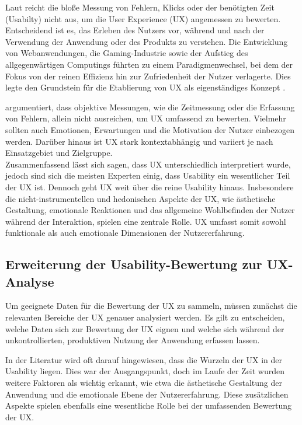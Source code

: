 \documentclass[12pt,oneside]{article}
\begin{document}
Laut \cite{GOISTAI} reicht die bloße Messung von Fehlern, Klicks oder der benötigten Zeit (Usabilty) nicht aus, um die User Experience (UX) angemessen zu bewerten. Entscheidend ist es, das Erleben des Nutzers vor, während und nach der Verwendung der Anwendung oder des Produkts zu verstehen. Die Entwicklung von Webanwendungen, die Gaming-Industrie sowie der Aufstieg des allgegenwärtigen Computings führten zu einem Paradigmenwechsel, bei dem der Fokus von der reinen Effizienz hin zur Zufriedenheit der Nutzer verlagerte. Dies legte den Grundstein für die Etablierung von UX als eigenständiges Konzept \cite{glanznig}.

\cite{Virpi} argumentiert, dass objektive Messungen, wie die Zeitmessung oder die Erfassung von Fehlern, allein nicht ausreichen, um UX umfassend zu bewerten. Vielmehr sollten auch Emotionen, Erwartungen und die Motivation der Nutzer einbezogen werden. Darüber hinaus ist UX stark kontextabhängig und variiert je nach Einsatzgebiet und Zielgruppe.\\
Zusammenfassend lässt sich sagen, dass UX unterschiedlich interpretiert wurde, jedoch sind sich die meisten Experten einig, dass Usability ein wesentlicher Teil der UX ist. Dennoch geht UX weit über die reine Usability hinaus. Insbesondere die nicht-instrumentellen und hedonischen Aspekte der UX, wie ästhetische Gestaltung, emotionale Reaktionen und das allgemeine Wohlbefinden der Nutzer während der Interaktion, spielen eine zentrale Rolle. UX umfasst somit sowohl funktionale als auch emotionale Dimensionen der Nutzererfahrung.
\subsection{Erweiterung der Usability-Bewertung zur UX-Analyse}
 
Um geeignete Daten für die Bewertung der UX zu sammeln, müssen zunächst die relevanten Bereiche der UX genauer analysiert werden. Es gilt zu entscheiden, welche Daten sich zur Bewertung der UX eignen und welche sich während der unkontrollierten, produktiven Nutzung der Anwendung erfassen lassen.

In der Literatur wird oft darauf hingewiesen, dass die Wurzeln der UX in der Usability liegen. Dies war der Ausgangspunkt, doch im Laufe der Zeit wurden weitere Faktoren als wichtig erkannt, wie etwa die ästhetische Gestaltung der Anwendung und die emotionale Ebene der Nutzererfahrung. Diese zusätzlichen Aspekte spielen ebenfalls eine wesentliche Rolle bei der umfassenden Bewertung der UX.
 
\end{document}
